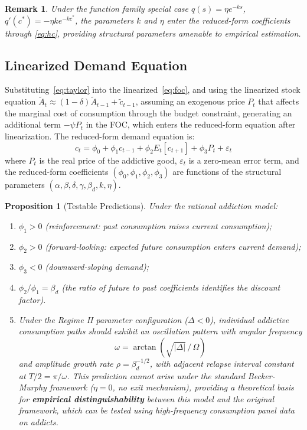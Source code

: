 \documentclass[12pt]{article}
\newtheorem{proposition}{Proposition}
\newtheorem{remark}{Remark}
\begin{document}
\begin{remark}
Under the function family special case
$q(s) = \eta e^{-ks}$, $q'(c^*) = -\eta k e^{-kc^*}$,
the parameters $k$ and $\eta$ enter the reduced-form coefficients through \eqref{eq:hc},
providing structural parameters amenable to empirical estimation.
\end{remark}

\subsection{Linearized Demand Equation}

Substituting~\eqref{eq:taylor} into the linearized~\eqref{eq:foc}, and using the linearized stock equation
$\tilde{A}_t \approx (1-\delta)\tilde{A}_{t-1} + \tilde{c}_{t-1}$, assuming an exogenous price $P_t$ that affects the marginal cost of consumption through the budget constraint, generating an additional term $-\psi P_t$ in the FOC, which enters the reduced-form equation after linearization. The reduced-form demand equation is:
\begin{equation}\label{eq:demand}
c_t = \phi_0 + \phi_1 c_{t-1} + \phi_2 E_t[c_{t+1}] + \phi_3 P_t + \varepsilon_t
\end{equation}
where $P_t$ is the real price of the addictive good, $\varepsilon_t$ is a zero-mean error term, and the reduced-form coefficients
$(\phi_0, \phi_1, \phi_2, \phi_3)$ are functions of the structural parameters $(\alpha, \beta, \delta, \gamma, \beta_d, k, \eta)$.

\begin{proposition}[Testable Predictions]
Under the rational addiction model:
\begin{enumerate}
\item $\phi_1 > 0$ (reinforcement: past consumption raises current consumption);
\item $\phi_2 > 0$ (forward-looking: expected future consumption enters current demand);
\item $\phi_3 < 0$ (downward-sloping demand);
\item $\phi_2/\phi_1 = \beta_d$ (the ratio of future to past coefficients identifies the discount factor).
\item Under the Regime II parameter configuration ($\Delta < 0$), individual addictive consumption paths should exhibit an oscillation pattern with angular frequency
\[
    \omega = \arctan\!\left(\!\sqrt{|\Delta|}\,/\,\Omega\right)
\]
and amplitude growth rate $\rho = \beta_d^{-1/2}$, with adjacent relapse interval constant at
$T/2 = \pi/\omega$. This prediction cannot arise under the standard Becker-Murphy framework ($\eta = 0$, no exit mechanism), providing a theoretical basis for \textbf{empirical distinguishability} between this model and the original framework, which can be tested using high-frequency consumption panel data on addicts.
 
\end{enumerate}
\end{proposition}
\end{document}

